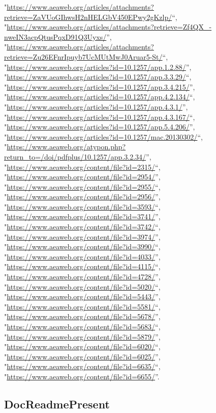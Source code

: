 \documentclass[]{article}
\newcommand{\fullline}{\noindent\makebox[\linewidth]{\rule{\textwidth}{0.4pt}}}
\begin{document}
\begin{itemize}
  "\url{https://www.aeaweb.org/articles/attachments?retrieve=ZaVUoGIhwsH2nHELGbV450EPwy2gKzlp/}``,
  "\url{https://www.aeaweb.org/articles/attachments?retrieve=Zf4QX_-nweIN3acpQtusPqxD91Q3Uyxs/}'',
  "\url{https://www.aeaweb.org/articles/attachments?retrieve=Zu26EFnrIpuyb7UcMUtMwJ0Aruar5-St/}``,
  "\url{https://www.aeaweb.org/articles?id=10.1257/app.1.2.88/}'',
  "\url{https://www.aeaweb.org/articles?id=10.1257/app.3.3.29/}``,
  "\url{https://www.aeaweb.org/articles?id=10.1257/app.3.4.215/}'',
  "\url{https://www.aeaweb.org/articles?id=10.1257/app.4.2.134/}``,
  "\url{https://www.aeaweb.org/articles?id=10.1257/app.4.3.1/}'',
  "\url{https://www.aeaweb.org/articles?id=10.1257/app.4.3.167/}``,
  "\url{https://www.aeaweb.org/articles?id=10.1257/app.5.4.206/}'',
  "\url{https://www.aeaweb.org/articles?id=10.1257/mac.20130302/}``,
  "\url{https://www.aeaweb.org/atypon.php?return_to=/doi/pdfplus/10.1257/app.3.2.34/}'',
  "\url{https://www.aeaweb.org/content/file?id=2315/}``,
  "\url{https://www.aeaweb.org/content/file?id=2954/}'',
  "\url{https://www.aeaweb.org/content/file?id=2955/}``,
  "\url{https://www.aeaweb.org/content/file?id=2956/}'',
  "\url{https://www.aeaweb.org/content/file?id=3593/}``,
  "\url{https://www.aeaweb.org/content/file?id=3741/}'',
  "\url{https://www.aeaweb.org/content/file?id=3742/}``,
  "\url{https://www.aeaweb.org/content/file?id=3974/}'',
  "\url{https://www.aeaweb.org/content/file?id=3990/}``,
  "\url{https://www.aeaweb.org/content/file?id=4033/}'',
  "\url{https://www.aeaweb.org/content/file?id=4115/}``,
  "\url{https://www.aeaweb.org/content/file?id=4728/}'',
  "\url{https://www.aeaweb.org/content/file?id=5020/}``,
  "\url{https://www.aeaweb.org/content/file?id=5443/}'',
  "\url{https://www.aeaweb.org/content/file?id=5581/}``,
  "\url{https://www.aeaweb.org/content/file?id=5678/}'',
  "\url{https://www.aeaweb.org/content/file?id=5683/}``,
  "\url{https://www.aeaweb.org/content/file?id=5879/}'',
  "\url{https://www.aeaweb.org/content/file?id=6020/}``,
  "\url{https://www.aeaweb.org/content/file?id=6025/}'',
  "\url{https://www.aeaweb.org/content/file?id=6635/}``,
  "\url{https://www.aeaweb.org/content/file?id=6655/}''.
\end{itemize}

\fullline

\hypertarget{docreadmepresent}{\subsection{DocReadmePresent}\label{docreadmepresent}}
\end{document}

